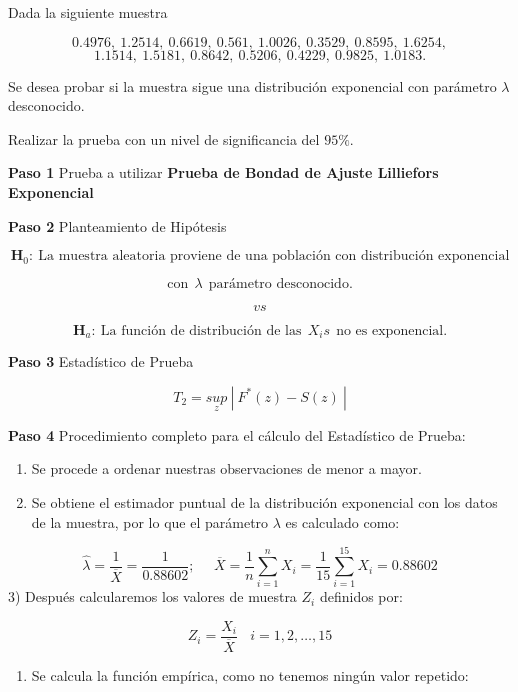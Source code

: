 \documentclass[
  a4paper,
  oneside,
  openany]{book}
\providecommand{\tightlist}{%
  \setlength{\itemsep}{0pt}\setlength{\parskip}{0pt}}
\begin{document}
Dada la siguiente muestra

\[0.4976,\ 1.2514,\ 0.6619,\ 0.561,\ 1.0026,\ 0.3529,\ 0.8595,\ 1.6254,\]
\[1.1514,\ 1.5181,\ 0.8642,\ 0.5206,\ 0.4229,\ 0.9825,\ 1.0183.\]

Se desea probar si la muestra sigue una distribución exponencial con parámetro \(\lambda\) desconocido.

Realizar la prueba con un nivel de significancia del \(95\%\).

\textbf{Paso 1} Prueba a utilizar \textbf{Prueba de Bondad de Ajuste Lilliefors Exponencial}

\textbf{Paso 2} Planteamiento de Hipótesis

\[\textbf{H}_0: \ \mbox{La muestra aleatoria proviene de una población con distribución exponencial}\]

\[\mbox{con} \ \  \lambda \ \  \mbox{parámetro desconocido.}\]

\[vs\]

\[\textbf{H}_a: \ \mbox{La función de distribución de las} \ \  X_{i}s \ \  \mbox{no es exponencial.}\]

\textbf{Paso 3} Estadístico de Prueba

\[T_{2}=\underset{z}{sup} \ | \ F^*(z)-S(z) \ |\]

\textbf{Paso 4} Procedimiento completo para el cálculo del Estadístico de Prueba:

\begin{enumerate}
\def\labelenumi{\arabic{enumi})}
\item
  Se procede a ordenar nuestras observaciones de menor a mayor.
\item
  Se obtiene el estimador puntual de la distribución exponencial con los datos de la muestra, por lo que el parámetro \(\lambda\) es calculado como:
\end{enumerate}

\[\hat{\lambda}=\frac{1}{\overline{X}}=\frac{1}{0.88602}; \ \ \ \ \ \  \overline{X}=\frac{1}{n}\sum_{i=1}^{n}X_{i}=\frac{1}{15}\sum_{i=1}^{15}X_{i}=0.88602\]
3) Después calcularemos los valores de muestra \(Z_{i}\) definidos por:

\[Z_{i}=\frac{X_{i}}{\overline{X}} \ \ \ \ i=1,2,\ldots,15\]

\begin{enumerate}
\def\labelenumi{\arabic{enumi})}
\setcounter{enumi}{3}
\tightlist
\item
  Se calcula la función empírica, como no tenemos ningún valor repetido:
\end{enumerate}
\end{document}

